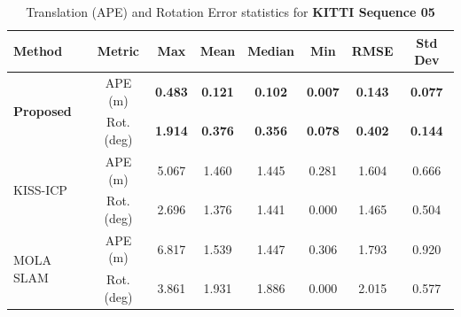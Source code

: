 \begin{table}[H]
	\centering
	\renewcommand{\arraystretch}{0.6}
	\setlength{\tabcolsep}{15pt}
	\caption{Translation (APE) and Rotation Error statistics for \textbf{KITTI Sequence 05}}
	\label{tab:ape_rot_kitti_seq5}
	
	\begin{adjustbox}{width=\textwidth}
		\begin{tabular}{@{}lccccccc@{}}
			\toprule
			\textbf{Method} & \textbf{Metric} & \textbf{Max} & \textbf{Mean} & \textbf{Median} & \textbf{Min} & \textbf{RMSE} & \textbf{Std Dev} \\
			\midrule
			
			\multirow{2}{*}{\textbf{Proposed}} 
			& APE (m)        & \textbf{0.483}   & \textbf{0.121}   & \textbf{0.102}     & \textbf{0.007}   & \textbf{0.143}   & \textbf{0.077} \\
			& Rot. (deg)     & \textbf{1.914}   & \textbf{0.376}   & \textbf{0.356}     & \textbf{0.078}   & \textbf{0.402}   & \textbf{0.144} \\
			\midrule
			
			\multirow{2}{*}{KISS-ICP} 
			& APE (m)        & 5.067   & 1.460   & 1.445     & 0.281    & 1.604   & 0.666 \\
			& Rot. (deg)     & 2.696   & 1.376   & 1.441     & 0.000    & 1.465   & 0.504 \\
			\midrule
			
			\multirow{2}{*}{MOLA SLAM} 
			& APE (m)        & 6.817   & 1.539   & 1.447     & 0.306    & 1.793   & 0.920 \\
			& Rot. (deg)     & 3.861   & 1.931   & 1.886     & 0.000    & 2.015   & 0.577 \\
			\bottomrule
		\end{tabular}
	\end{adjustbox}
\end{table}


